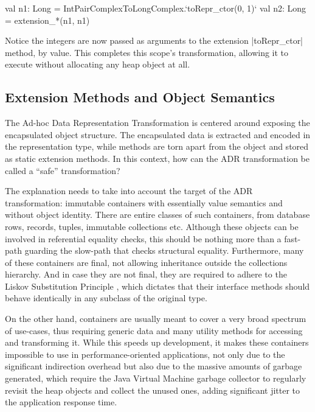 \begin{lstlisting-nobreak}
val n1: Long = IntPairComplexToLongComplex.`toRepr_ctor(0, 1)`
val n2: Long = extension_*(n1, n1)
\end{lstlisting-nobreak}

Notice the integers are now passed as arguments to the extension |toRepr_ctor| method, by value. This completes this scope's transformation, allowing it to execute without allocating any heap object at all.

\subsection{Extension Methods and Object Semantics}
\label{sec:ildl:discussion}
The Ad-hoc Data Representation Transformation is centered around exposing the encapsulated object structure. The encapsulated data is extracted and encoded in the representation type, while methods are torn apart from the object and stored as static extension methods. In this context, how can the ADR transformation be called a ``safe'' transformation?

The explanation needs to take into account the target of the ADR transformation: immutable containers with essentially value semantics and without object identity. There are entire classes of such containers, from database rows, records, tuples, immutable collections etc. Although these objects can be involved in referential equality checks, this should be nothing more than a fast-path guarding the slow-path that checks structural equality. Furthermore, many of these containers are final, not allowing inheritance outside the collections hierarchy. And in case they are not final, they are required to adhere to the Liskov Substitution Principle \cite{liskov-substitution-principle}, which dictates that their interface methods should behave identically in any subclass of the original type.

On the other hand, containers are usually meant to cover a very broad spectrum of use-cases, thus requiring generic data and many utility methods for accessing and transforming it. While this speeds up development, it makes these containers impossible to use in performance-oriented applications, not only due to the significant indirection overhead but also due to the massive amounts of garbage generated, which require the Java Virtual Machine garbage collector to regularly revisit the heap objects and collect the unused ones, adding significant jitter to the application response time.

